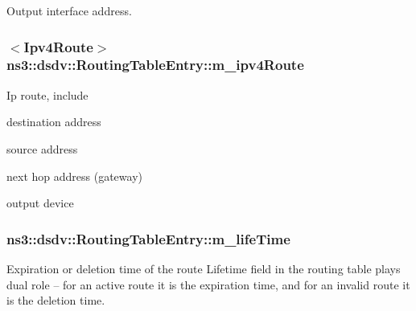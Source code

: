 Output interface address. 

\subsubsection[{\texorpdfstring{m\+\_\+ipv4\+Route}{m_ipv4Route}}]{$<${\bf Ipv4\+Route}$>$ ns3\+::dsdv\+::\+Routing\+Table\+Entry\+::m\+\_\+ipv4\+Route\hspace{0.3cm}{\ttfamily [private]}}\hypertarget{classns3_1_1dsdv_1_1RoutingTableEntry_aa85a4fd1254650abc9e07e66288ba0bc}{}\label{classns3_1_1dsdv_1_1RoutingTableEntry_aa85a4fd1254650abc9e07e66288ba0bc}
Ip route, include
\begin{DoxyItemize}
\item destination address
\item source address
\item next hop address (gateway)
\item output device 
\end{DoxyItemize}
\subsubsection[{\texorpdfstring{m\+\_\+life\+Time}{m_lifeTime}}]{ ns3\+::dsdv\+::\+Routing\+Table\+Entry\+::m\+\_\+life\+Time\hspace{0.3cm}{\ttfamily [private]}}\hypertarget{classns3_1_1dsdv_1_1RoutingTableEntry_a2d0df3df20b4a89f08a88bc3ccafb331}{}\label{classns3_1_1dsdv_1_1RoutingTableEntry_a2d0df3df20b4a89f08a88bc3ccafb331}


Expiration or deletion time of the route Lifetime field in the routing table plays dual role -- for an active route it is the expiration time, and for an invalid route it is the deletion time. 

